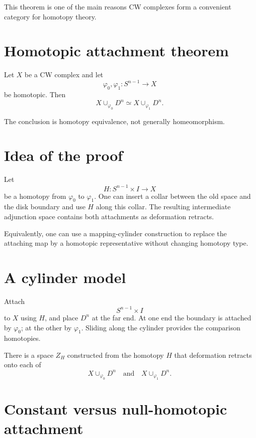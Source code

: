 This theorem is one of the main reasons CW complexes form a convenient
category for homotopy theory.

\section{Homotopic attachment theorem}

\begin{theorem}
\label{thm:viii08-homotopic-attachment}
Let \(X\) be a CW complex and let
\[
\varphi_0,\varphi_1:S^{n-1}\to X
\]
be homotopic.  Then
\[
X\cup_{\varphi_0}D^n
\simeq
X\cup_{\varphi_1}D^n.
\]
\end{theorem}

The conclusion is homotopy equivalence, not generally homeomorphism.

\section{Idea of the proof}

Let
\[
H:S^{n-1}\times I\to X
\]
be a homotopy from \(\varphi_0\) to \(\varphi_1\).  One can insert a collar
between the old space and the disk boundary and use \(H\) along this collar.
The resulting intermediate adjunction space contains both attachments as
deformation retracts.

Equivalently, one can use a mapping-cylinder construction to replace the
attaching map by a homotopic representative without changing homotopy type.

\section{A cylinder model}

Attach
\[
S^{n-1}\times I
\]
to \(X\) using \(H\), and place \(D^n\) at the far end.  At one end the boundary
is attached by \(\varphi_0\); at the other by \(\varphi_1\).  Sliding along the
cylinder provides the comparison homotopies.

\begin{proposition}
\label{prop:viii08-interpolation}
There is a space \(Z_H\) constructed from the homotopy \(H\) that deformation
retracts onto each of
\[
X\cup_{\varphi_0}D^n
\quad\text{and}\quad
X\cup_{\varphi_1}D^n.
\]
\end{proposition}

\section{Constant versus null-homotopic attachment}

